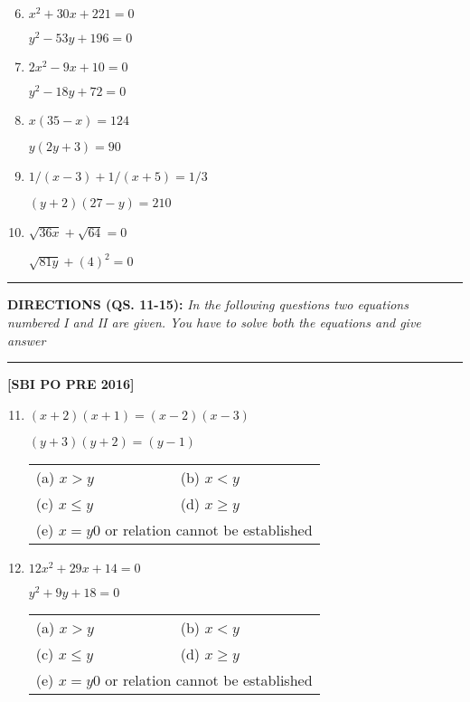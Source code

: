 \begin{multicols}{2}
\begin{enumerate}[leftmargin=*]
\setcounter{enumi}{5}
\item $x^2 + 30x + 221 = 0$

$y^2 - 53y + 196 = 0$

\item $2x^2 - 9x + 10 = 0$

$y^2 - 18y + 72 = 0$

\item $x(35 - x) = 124$

$y(2y + 3) = 90$

\item $1/(x - 3) + 1/(x + 5) = 1/3$

$(y + 2)(27 - y) = 210$

\item $\sqrt{36x} + \sqrt{64} = 0$

$\sqrt{81y} + (4)^{2} = 0$
\end{enumerate}

\noindent
\rule{\columnwidth}{1pt}

\noindent
{\sf\bfseries DIRECTIONS (QS. 11-15):} {\it In the following questions two equations numbered I and II are given. You have to solve both the equations and give answer}

\noindent
\rule{\columnwidth}{1pt}

\noindent
\hfill{\bf [SBI PO PRE 2016]}


\begin{enumerate}[leftmargin=*]
\setcounter{enumi}{10}
\item $(x+2)(x+1) = (x-2)(x-3)$

  $(y+3)(y+2) = (y-1)$

\begin{tabular}{l@{\qquad\quad}l}
(a) $x > y$ & (b) $x < y$\\ 
(c) $x \leq y$ & (d) $x \geq y$\\ 
\multicolumn{2}{l}{(e) $x =y0$ or relation cannot be established}
\end{tabular}

\item $12x^2 + 29x + 14 = 0$

$y^2 + 9y + 18 = 0$

\begin{tabular}{l@{\qquad\quad}l}
(a) $x > y$ & (b) $x < y$\\ 
(c) $x \leq y$ & (d) $x \geq y$\\ 
\multicolumn{2}{l}{(e) $x =y0$ or relation cannot be established}
\end{tabular}


\end{enumerate}
\end{multicols}
